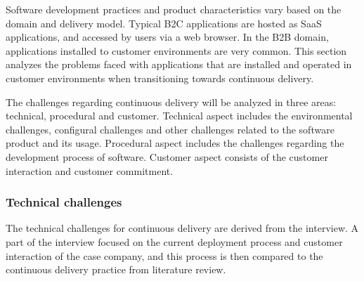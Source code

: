 \documentclass[english]{tktltiki2}
\theoremstyle{definition}
\theoremstyle{remark}
\begin{document}
Software development practices and product characteristics vary based on the domain and delivery model. Typical B2C applications are hosted as SaaS applications, and accessed by users via a web browser. In the B2B domain, applications installed to customer environments are very common. This section analyzes the problems faced with applications that are installed and operated in customer environments when transitioning towards continuous delivery.

The challenges regarding continuous delivery will be analyzed in three areas: technical, procedural and customer. Technical aspect includes the environmental challenges, configural challenges and other challenges related to the software product and its usage. Procedural aspect includes the challenges regarding the development process of software. Customer aspect consists of the customer interaction and customer commitment.

\subsubsection{Technical challenges}
The technical challenges for continuous delivery are derived from the interview. A part of the interview focused on the current deployment process and customer interaction of the case company, and this process is then compared to the continuous delivery practice from literature review.
\end{document}
